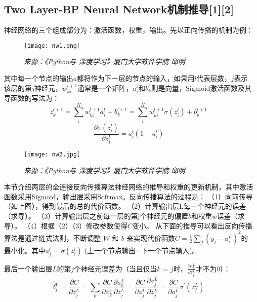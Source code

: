 \documentclass[cn]{elegantpaper}
\begin{document}
\subsection{Two Layer-BP Neural Network机制推导[1][2]}
神经网络的三个组成部分为：激活函数，权重，输出。先以正向传播的机制为例：
\begin{figure}[H]
	\centering
	\texttt{[image: nw1.png]}
	\caption{ \emph{来源：《Python与 深度学习》厦门大学软件学院 邱明}}
	 \bigbreak
\end{figure}
其中每一个节点的输出$a$都将作为下一层的节点的输入，如果用$l$代表层数，$j$表示该层的第$j$神经元，$w_{k i}^{l+1}$通常是一个矩阵，$a_{i}^{l}$和$b_{k}^{l}$则是向量，Sigmoid激活函数及其导函数的写法为：
\begin{equation}
z_{k}^{l+1}=\sum_{i}^K w_{k i}^{l+1} a_{i}^{l}+b_{k}^{l+1}=\sum_{i}^K w_{k i}^{l+1} \sigma\left(z_{i}^{l}\right)+b_{k}^{l+1}
\end{equation}
\begin{equation}
\frac{\partial \sigma\left(z_{i}^{l}\right)}{\partial z_{i}^{l}}=a_{i}^{l}\left(1-a_{i}^{l}\right)
\end{equation}
\begin{figure}[H]
	\centering
	\texttt{[image: nw2.jpg]}
	\caption{ \emph{来源：《Python与 深度学习》厦门大学软件学院 邱明}}
\end{figure}
本节介绍两层的全连接反向传播算法神经网络的推导和权重的更新机制，其中激活函数采用Sigmoid，输出层采用Softmax。反向传播算法的过程是：
（1）向前传导（如上图），得到最后的总的代价函数。
（2）计算输出层L每一个神经元的误差（求导）。
（3）计算输出层之前每一层的第j个神经元的偏置$b$和权重$w$误差（求导）。
（4）根据（2）（3）修改参数使得$C$变小。
从下面的推导可以看出反向传播算法是通过链式法则，不断调整 $W$ 和 $b$ 来实现代价函数$C=\frac{1}{2} \sum_{j}\left(y_{j}-a_{i}^{L}\right)^{2}$的最小化。其中$a_{j}^{l}=\sigma\left(z_{i}^{l}\right)$ (上一个节点输出=下一个节点输入)。


最后一个输出层$L$的第$j$个神经元误差为（当且仅当$k$ = $j$时，$\frac{\partial a_{k}^{L}}{\partial z_{j}^{L}}$才不为0）：
\begin{equation}
\delta_{\mathrm{j}}^{\mathrm{L}}=\frac{\partial C}{\partial z_{j}^{L}}=\sum_{k} \frac{\partial C}{\partial a_{k}^{\mathrm{L}}} \frac{\partial a_{k}^{L}}{\partial z_{j}^{L}}=\frac{\partial C}{\partial a_{j}^{L}} \frac{\partial a_{j}^{L}}{\partial z_{j}^{L}}=\frac{\partial C}{\partial a_{j}^{L}} \sigma^{\prime}\left(z_{j}^{L}\right)
\end{equation}
\end{document}
